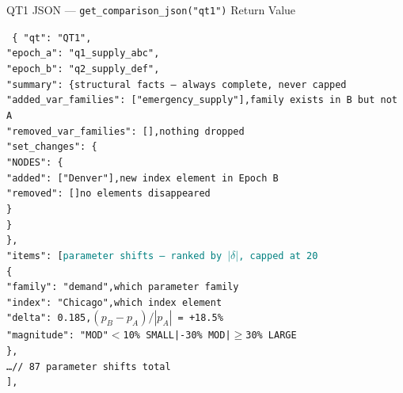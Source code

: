 \documentclass[aspectratio=169,10pt]{beamer}
\begin{document}
\begin{frame}[t]{QT1 JSON — \texttt{get\_comparison\_json("qt1")} Return Value}
\vspace{1pt}
\begin{block}{}
  \texttt{\scriptsize
    \{\,"qt": "QT1",\\
    \quad "epoch\_a": "q1\_supply\_abc",\\
    \quad "epoch\_b": "q2\_supply\_def",\\[1pt]
    \quad "summary": \{\hfill\textcolor{pblue}{\tiny structural facts — always complete, never capped}\\
    \quad\quad "added\_var\_families": ["emergency\_supply"],\hfill\textcolor{aorng}{\tiny family exists in B but not A}\\
    \quad\quad "removed\_var\_families": [],\hfill\textcolor{mgray}{\tiny nothing dropped}\\
    \quad\quad "set\_changes": \{\\
    \quad\quad\quad "NODES": \{\\
    \quad\quad\quad\quad "added": ["Denver"],\hfill\textcolor{aorng}{\tiny new index element in Epoch B}\\
    \quad\quad\quad\quad "removed": []\hfill\textcolor{mgray}{\tiny no elements disappeared}\\
    \quad\quad\quad \}\\
    \quad\quad \}\\
    \quad \},\\[1pt]
    \quad "items": [\hfill\textcolor{teal}{\tiny parameter shifts — ranked by $|\delta|$, capped at 20}\\
    \quad\quad \{\\
    \quad\quad\quad "family": "demand",\hfill\textcolor{mgray}{\tiny which parameter family}\\
    \quad\quad\quad "index":\ "Chicago",\hfill\textcolor{mgray}{\tiny which index element}\\
    \quad\quad\quad "delta":\ 0.185,\hfill\textcolor{pblue}{\tiny $(p_B - p_A)/|p_A|$ = +18.5\%}\\
    \quad\quad\quad "magnitude": "MOD"\hfill\textcolor{aorng}{\tiny $<$10\% \textrm{SMALL}\;|-30\% \textrm{MOD}\;|\;$\geq$30\% \textrm{LARGE}}\\
    \quad\quad \},\\
    \quad\quad \ldots\quad\textcolor{mgray}{// 87 parameter shifts total}\\
    \quad ],\\
}
\end{block}
\end{frame}
\end{document}
